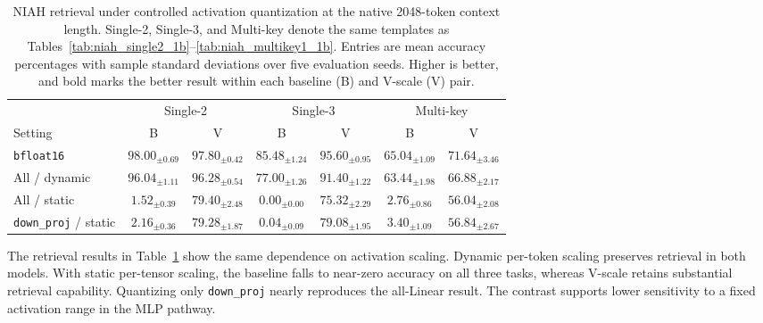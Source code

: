 \documentclass{article}
\theoremstyle{plain}
\theoremstyle{definition}
\theoremstyle{remark}
\begin{document}
\begin{table}[ht]
    \centering
    \caption{
    NIAH retrieval under controlled activation quantization at the native 2048-token context length. Single-2, Single-3, and Multi-key denote the same templates as Tables~\ref{tab:niah_single2_1b}--\ref{tab:niah_multikey1_1b}. Entries are mean accuracy percentages with sample standard deviations over five evaluation seeds. Higher is better, and bold marks the better result within each baseline (B) and V-scale (V) pair.
    }\label{tab:activation_quantization_niah}
    \setlength\tabcolsep{3.2pt}
    \begin{tabular}{lcccccc}
        \toprule
        & \multicolumn{2}{c}{Single-2}
        & \multicolumn{2}{c}{Single-3} & \multicolumn{2}{c}{Multi-key}\\
        \cmidrule(lr){2-3}\cmidrule(lr){4-5}\cmidrule(lr){6-7}
        Setting & B & V & B & V & B & V \\
        \midrule
        \texttt{bfloat16} & $\mathbf{98.00}_{\pm 0.69}$ & $97.80_{\pm 0.42}$ & $85.48_{\pm 1.24}$ & $\mathbf{95.60}_{\pm 0.95}$ & $65.04_{\pm 1.09}$ & $\mathbf{71.64}_{\pm 3.46}$ \\
        All / dynamic & $96.04_{\pm 1.11}$ & $\mathbf{96.28}_{\pm 0.54}$ & $77.00_{\pm 1.26}$ & $\mathbf{91.40}_{\pm 1.22}$ & $63.44_{\pm 1.98}$ & $\mathbf{66.88}_{\pm 2.17}$ \\
        All / static & $1.52_{\pm 0.39}$ & $\mathbf{79.40}_{\pm 2.48}$ & $0.00_{\pm 0.00}$ & $\mathbf{75.32}_{\pm 2.29}$ & $2.76_{\pm 0.86}$ & $\mathbf{56.04}_{\pm 2.08}$ \\
        \texttt{down\_proj} / static & $2.16_{\pm 0.36}$ & $\mathbf{79.28}_{\pm 1.87}$ & $0.04_{\pm 0.09}$ & $\mathbf{79.08}_{\pm 1.95}$ & $3.40_{\pm 1.09}$ & $\mathbf{56.84}_{\pm 2.67}$ \\
        \bottomrule
    \end{tabular}
\end{table}

The retrieval results in Table~\ref{tab:activation_quantization_niah} show the same dependence on activation scaling. Dynamic per-token scaling preserves retrieval in both models. With static per-tensor scaling, the baseline falls to near-zero accuracy on all three tasks, whereas V-scale retains substantial retrieval capability. Quantizing only \texttt{down\_proj} nearly reproduces the all-Linear result. The contrast supports lower sensitivity to a fixed activation range in the MLP pathway.

\clearpage
\end{document}

